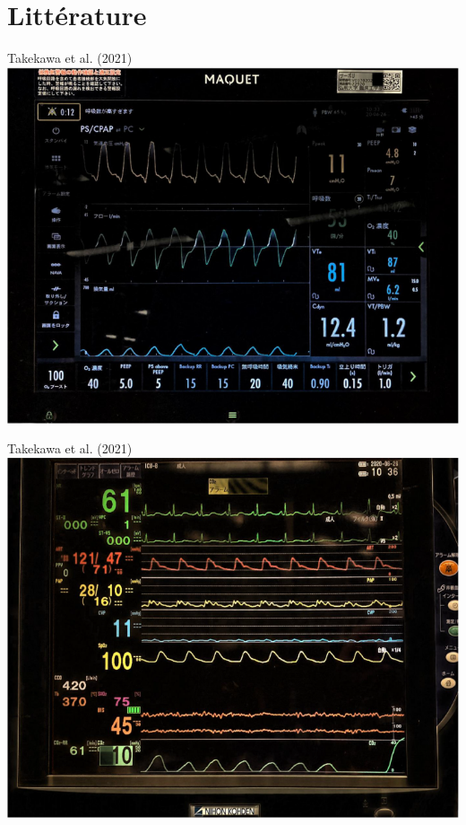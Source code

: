 \section{Littérature}

%

\begin{frame}{Takekawa et al. (2021)}
	\centering
	\includegraphics[clip, trim=20 5 22 25]{captures/Takekawa2021-1}
\end{frame}

\begin{frame}{Takekawa et al. (2021)}
	\centering
	\includegraphics[clip, trim=33 0 35 15]{captures/Takekawa2021-2}
\end{frame}

